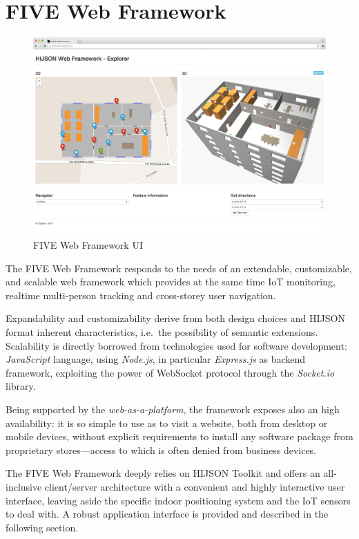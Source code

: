 \section{FIVE Web Framework}\label{five-web-framework}

\begin{figure}[htb]
\centering
\includegraphics[width=\textwidth]{images/web_framework_2.png}
\caption{FIVE Web Framework UI}
\label{fig:web-framework-ui}
\end{figure}

The FIVE Web Framework responds to the needs of an extendable,
customizable, and scalable web framework which provides at the same time IoT
monitoring, realtime multi-person tracking and cross-storey user
navigation.

Expandability and customizability derive from both design choices and
HIJSON format inherent characteristics, i.e.~the possibility of semantic extensions.
Scalability is directly borrowed from technologies used for
software development: \emph{JavaScript} language, using \emph{Node.js},
in particular \emph{Express.js} as backend framework, exploiting the
power of WebSocket protocol through the \emph{Socket.io} library.

Being supported by the \emph{web-as-a-platform}, the framework exposes
also an high availability: it is so simple to use as to visit a
website, both from desktop or mobile devices, without explicit
requirements to install any software package from proprietary stores---access to
which is often denied from business devices.

The FIVE Web Framework deeply relies on HIJSON Toolkit and offers an
all-inclusive client/server architecture with a convenient and highly interactive
user interface, leaving aside the specific indoor positioning system and
the IoT sensors to deal with. A robust application interface is provided and
described in the following section.

